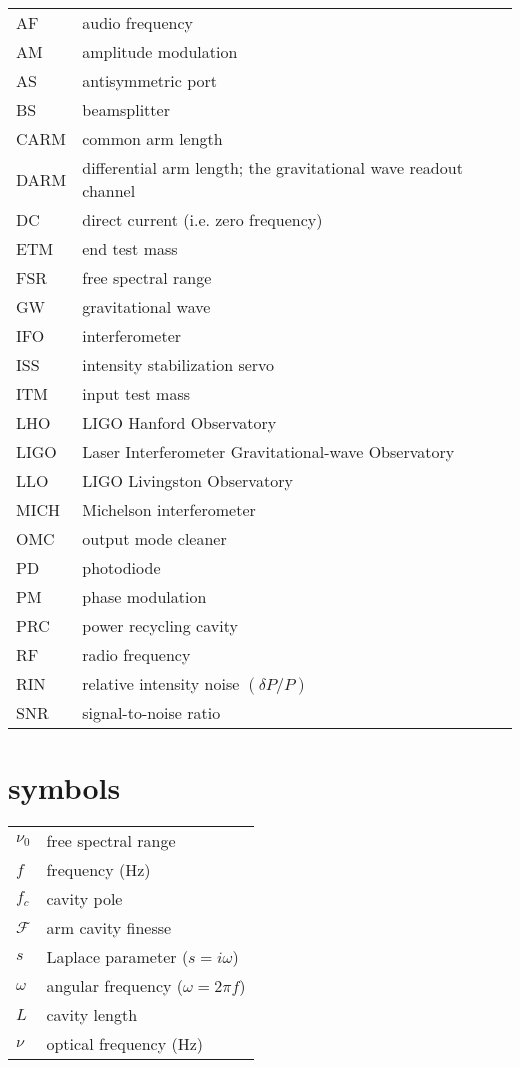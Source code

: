 \label{chapter6}
\doublespace
{}
\singlespacing
\begin{tabular}{|l|l|}
\hline 
AF   & audio frequency \\
AM   & amplitude modulation \\
AS   & antisymmetric port \\
BS   & beamsplitter \\
CARM & common arm length \\
DARM & differential arm length; the gravitational wave readout channel \\
DC   & direct current (i.e. zero frequency) \\
ETM  & end test mass \\
FSR  & free spectral range \\
GW   & gravitational wave \\
IFO  & interferometer \\
ISS  & intensity stabilization servo \\
ITM  & input test mass \\
LHO  & LIGO Hanford Observatory \\
LIGO & Laser Interferometer Gravitational-wave Observatory \\
LLO  & LIGO Livingston Observatory \\
MICH & Michelson interferometer \\
OMC  & output mode cleaner \\
PD   & photodiode \\
PM   & phase modulation \\
PRC  & power recycling cavity \\
RF   & radio frequency \\
RIN  & relative intensity noise $(\delta P/P)$ \\
SNR  & signal-to-noise ratio \\
\hline
\end{tabular}

\section{symbols}

\begin{tabular}{|l|l|}
\hline
$\nu_0$         & free spectral range \\
$f$             & frequency (Hz) \\
$f_c$           & cavity pole \\
$\mathcal{F}$   & arm cavity finesse \\
$s$             & Laplace parameter ($s=i\omega$) \\
$\omega$        & angular frequency ($\omega=2\pi f$) \\
$L$             & cavity length \\
$\nu$           & optical frequency (Hz) \\
\hline
\end{tabular}
